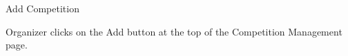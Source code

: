 
\begin{uc}{Add Competition}

    
    \begin{uc-trig}
        Organizer clicks on the Add button at the top of the Competition Management page.
    \end{uc-trig}
\end{uc}

